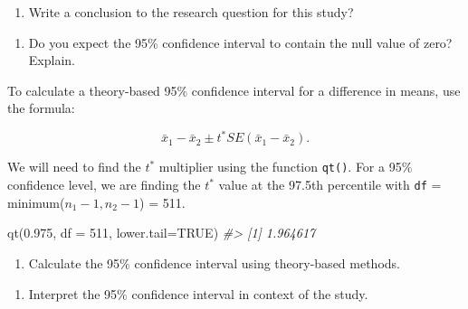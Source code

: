 \documentclass[
]{report}
\newenvironment{Shaded}{\begin{snugshade}}{\end{snugshade}}
\newcommand{\AttributeTok}[1]{\textcolor[rgb]{0.77,0.63,0.00}{#1}}
\newcommand{\CommentTok}[1]{\textcolor[rgb]{0.56,0.35,0.01}{\textit{#1}}}
\newcommand{\ConstantTok}[1]{\textcolor[rgb]{0.00,0.00,0.00}{#1}}
\newcommand{\DecValTok}[1]{\textcolor[rgb]{0.00,0.00,0.81}{#1}}
\newcommand{\FloatTok}[1]{\textcolor[rgb]{0.00,0.00,0.81}{#1}}
\newcommand{\FunctionTok}[1]{\textcolor[rgb]{0.00,0.00,0.00}{#1}}
\newcommand{\NormalTok}[1]{#1}
\providecommand{\tightlist}{%
  \setlength{\itemsep}{0pt}\setlength{\parskip}{0pt}}
\begin{document}
\vspace{0.3in}

\begin{enumerate}
\def\labelenumi{\arabic{enumi}.}
\setcounter{enumi}{8}
\tightlist
\item
  Write a conclusion to the research question for this study?
\end{enumerate}

\vspace{0.5in}

\begin{enumerate}
\def\labelenumi{\arabic{enumi}.}
\setcounter{enumi}{9}
\tightlist
\item
  Do you expect the 95\% confidence interval to contain the null value of zero? Explain.
\end{enumerate}

\vspace{0.8in}

To calculate a theory-based 95\% confidence interval for a difference in means, use the formula:

\[\bar{x}_1- \bar{x}_2\pm t^* SE(\bar{x}_1- \bar{x}_2).\]

We will need to find the \(t^*\) multiplier using the function \texttt{qt()}. For a 95\% confidence level, we are finding the \(t^*\) value at the 97.5th percentile with \texttt{df} = minimum(\(n_1 - 1, n_2 - 1\)) = 511.

\begin{Shaded}
\begin{Highlighting}[]
\FunctionTok{qt}\NormalTok{(}\FloatTok{0.975}\NormalTok{, }\AttributeTok{df =} \DecValTok{511}\NormalTok{, }\AttributeTok{lower.tail=}\ConstantTok{TRUE}\NormalTok{)}
\CommentTok{\#\textgreater{} [1] 1.964617}
\end{Highlighting}
\end{Shaded}

\begin{enumerate}
\def\labelenumi{\arabic{enumi}.}
\setcounter{enumi}{10}
\tightlist
\item
  Calculate the 95\% confidence interval using theory-based methods.
\end{enumerate}

\vspace{1in}

\begin{enumerate}
\def\labelenumi{\arabic{enumi}.}
\setcounter{enumi}{11}
\tightlist
\item
  Interpret the 95\% confidence interval in context of the study.
\end{enumerate}
\end{document}
